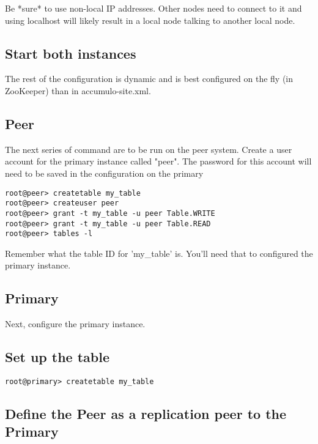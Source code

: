 Be *sure* to use non-local IP addresses. Other nodes need to connect to it and using localhost will likely result in
a local node talking to another local node.

\subsection{Start both instances}

The rest of the configuration is dynamic and is best configured on the fly (in ZooKeeper) than in accumulo-site.xml.

\subsection{Peer}

The next series of command are to be run on the peer system. Create a user account for the primary instance called
"peer". The password for this account will need to be saved in the configuration on the primary

\begingroup\fontsize{8pt}{8pt}\selectfont\begin{verbatim}
root@peer> createtable my_table
root@peer> createuser peer
root@peer> grant -t my_table -u peer Table.WRITE
root@peer> grant -t my_table -u peer Table.READ
root@peer> tables -l
\end{verbatim}\endgroup

Remember what the table ID for 'my\_table' is. You'll need that to configured the primary instance.

\subsection{Primary}

Next, configure the primary instance.

\subsection{Set up the table}

\begingroup\fontsize{8pt}{8pt}\selectfont\begin{verbatim}
root@primary> createtable my_table
\end{verbatim}\endgroup

\subsection{Define the Peer as a replication peer to the Primary}

